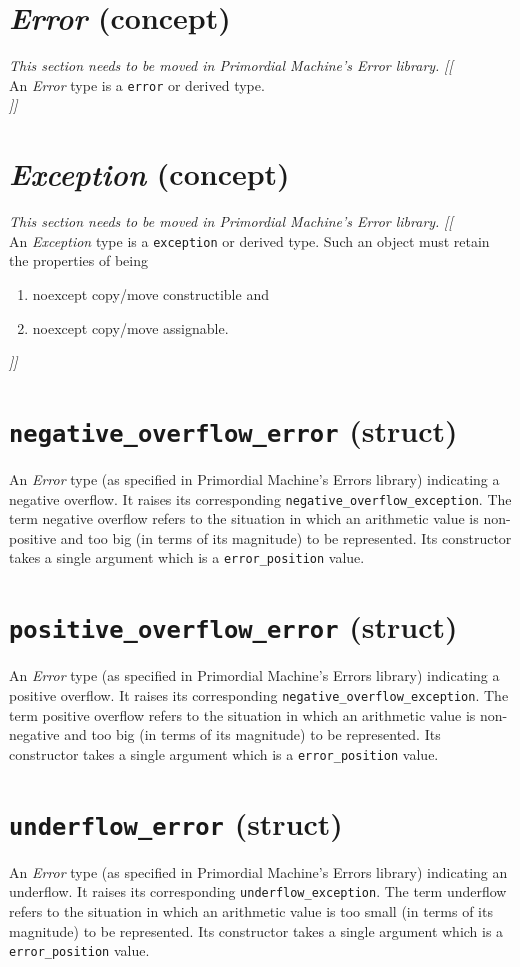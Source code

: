 \documentclass[oneside]{book}
\begin{document}
\section{\textit{Error} (concept)}
\textit{\color{orange}This section needs to be moved in Primordial Machine's Error library.}
\noindent\textit{\color{orange}[[}\\
An \textit{Error} type is a \texttt{error} or derived type.\\
\noindent\textit{\color{orange}]]}

\section{\textit{Exception} (concept)}
\textit{\color{orange}This section needs to be moved in Primordial Machine's Error library.}
\noindent\textit{\color{orange}[[}\\
An \textit{Exception} type is a \texttt{exception} or derived type.
Such an object must retain the properties of being
\begin{enumerate}
  \item noexcept copy/move constructible and
  \item noexcept copy/move assignable.
\end{enumerate}
\noindent\textit{\color{orange}]]}

\section{\texttt{negative\_overflow\_error} (struct)}
An \textit{Error} type (as specified in Primordial Machine's Errors library) indicating a negative overflow.
It raises its corresponding \texttt{negative\_overflow\_exception}.
The term negative overflow refers to the situation in which an arithmetic value is non-positive and
too big (in terms of its magnitude) to be represented. Its constructor takes a single argument which
is a \texttt{error\_position} value.

\section{\texttt{positive\_overflow\_error} (struct)}
An \textit{Error} type (as specified in Primordial Machine's Errors library) indicating a positive overflow.
It raises its corresponding \texttt{negative\_overflow\_exception}.
The term positive overflow refers to the situation in which an arithmetic value is non-negative and
too big (in terms of its magnitude) to be represented. Its constructor takes a single argument which
is a \texttt{error\_position} value.

\section{\texttt{underflow\_error} (struct)}
An \textit{Error} type (as specified in Primordial Machine's Errors library) indicating an underflow.
It raises its corresponding \texttt{underflow\_exception}.
The term underflow refers to the situation in which an arithmetic value is too small (in terms of
its magnitude) to be represented. Its constructor takes a single argument which
is a \texttt{error\_position} value.
\end{document}
